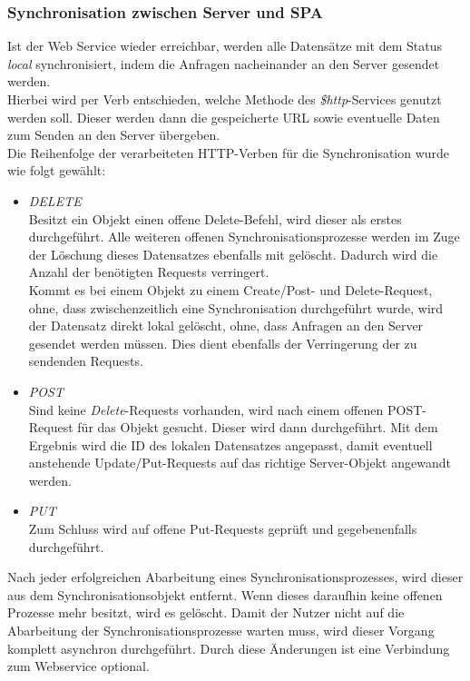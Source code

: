 \subsubsection*{Synchronisation zwischen Server und SPA}
\label{ssec:Sync-SPA}
Ist der Web Service wieder erreichbar, werden alle Datensätze mit dem Status \textit{local} synchronisiert, indem die Anfragen nacheinander an den Server gesendet werden. \\Hierbei wird per Verb entschieden, welche Methode des \textit{\$http}-Services genutzt werden soll. Dieser werden dann die gespeicherte URL sowie eventuelle Daten zum Senden an den Server übergeben. \\
Die Reihenfolge der verarbeiteten HTTP-Verben für die Synchronisation wurde wie folgt gewählt:
\begin{itemize}
\item \textit{DELETE}\\
Besitzt ein Objekt einen offene Delete-Befehl, wird dieser als erstes durchgeführt. Alle weiteren offenen Synchronisationsprozesse werden im Zuge der Löschung dieses Datensatzes ebenfalls mit gelöscht. Dadurch wird die Anzahl der benötigten Requests verringert. \\Kommt es bei einem Objekt zu einem Create/Post- und Delete-Request, ohne, dass zwischenzeitlich eine Synchronisation durchgeführt wurde, wird der Datensatz direkt lokal gelöscht, ohne, dass Anfragen an den Server gesendet werden müssen. Dies dient ebenfalls der Verringerung der zu sendenden Requests. 
\item \textit{POST} \\
Sind keine \textit{Delete}-Requests vorhanden, wird nach einem offenen POST-Request für das Objekt gesucht. Dieser wird dann durchgeführt. Mit dem Ergebnis wird die ID des lokalen Datensatzes angepasst, damit eventuell anstehende Update/Put-Requests auf das richtige Server-Objekt angewandt werden.
\item \textit{PUT} \\
Zum Schluss wird auf offene Put-Requests geprüft und gegebenenfalls durchgeführt. 
\end{itemize}
Nach jeder erfolgreichen Abarbeitung eines Synchronisationsprozesses, wird dieser aus dem Synchronisationsobjekt entfernt. Wenn dieses daraufhin keine offenen Prozesse mehr besitzt, wird es gelöscht. 
Damit der Nutzer nicht auf die Abarbeitung der Synchronisationsprozesse warten muss, wird dieser Vorgang komplett asynchron durchgeführt. Durch diese Änderungen ist eine Verbindung zum Webservice optional.

